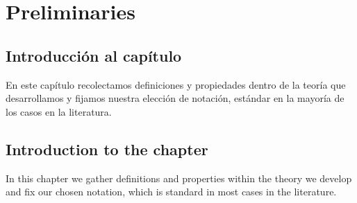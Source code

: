\chapter{Preliminaries}\label{auxlabel207}
\section*{Introducci\'on al cap\'itulo}
En este cap\'itulo recolectamos definiciones y propiedades
dentro de la teor\'ia que desarrollamos y fijamos nuestra 
elecci\'on de notaci\'on, est\'andar en la mayor\'ia de los casos 
en la literatura.
\section*{Introduction to the chapter}
In this chapter we gather definitions and properties
within the theory we develop and
fix our chosen notation, which is standard in most cases in
the literature.
\label{chap_prelim}





